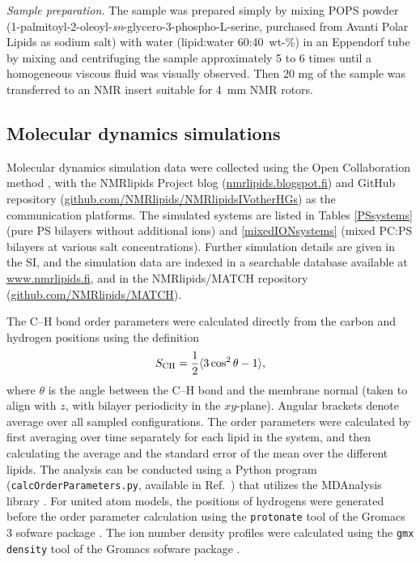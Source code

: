 \documentclass[aps,prl,superscriptaddress,twocolumn]{revtex4}
\begin{document}
\emph{Sample preparation.}
The sample was prepared simply by mixing POPS powder (1-palmitoyl-2-oleoyl-{\it sn}-glycero-3-phospho-L-serine, purchased from Avanti Polar Lipids
as sodium salt) with water (lipid:water 60:40~wt-\%) in an Eppendorf tube by mixing and centrifuging the sample approximately 5 to 6 times
until a homogeneous viscous fluid was visually observed. Then 20 mg of the sample was transferred to an NMR insert suitable for 4~mm NMR rotors.  


\subsection{Molecular dynamics simulations}
Molecular dynamics simulation data were collected using
the Open Collaboration method \cite{botan15}, with
the NMR\-lipids Project blog (\url{nmrlipids.blogspot.fi}) and
GitHub repository (\url{github.com/NMRlipids/NMRlipidsIVotherHGs})
as the communication platforms.
The simulated systems are listed in 
Tables \ref{PSsystems} (pure PS bilayers without additional ions) 
and \ref{mixedIONsystems} (mixed PC:PS bilayers at various salt concentrations).
Further simulation details are given in the SI, and
the simulation data are indexed in a
searchable database available at \url{www.nmrlipids.fi},
and in the NMRlipids/MATCH repository (\url{github.com/NMRlipids/MATCH}).

The C--H bond order parameters were calculated directly
from the carbon and hydrogen positions using the definition
\begin{equation}
S_{\rm CH}=\frac{1}{2}\langle 3\cos^2\theta -1 \rangle,
\end{equation}
where $\theta$ is the angle between the C--H bond and the membrane normal
(taken to align with $z$, with bilayer periodicity in the $xy$-plane).
Angular brackets denote average over all sampled configurations.
The order parameters were calculated by first averaging over time separately
for each lipid in the system, and then calculating the average and
the standard error of the mean over the different lipids. The analysis can be conducted using a
Python program ({\tt calcOrderParameters.py}, available in Ref.~) that utilizes the
MDAnalysis library \cite{agrawal11,gowers16}.
For united atom models, the positions of hydrogens were generated before the order parameter calculation using the {\tt protonate} tool
of the Gromacs 3 sofware package \cite{gromacsMANUAL}.
The ion number density profiles were calculated using the {\tt gmx density} tool
of the Gromacs sofware package \cite{gromacsMANUAL}.
\end{document}
